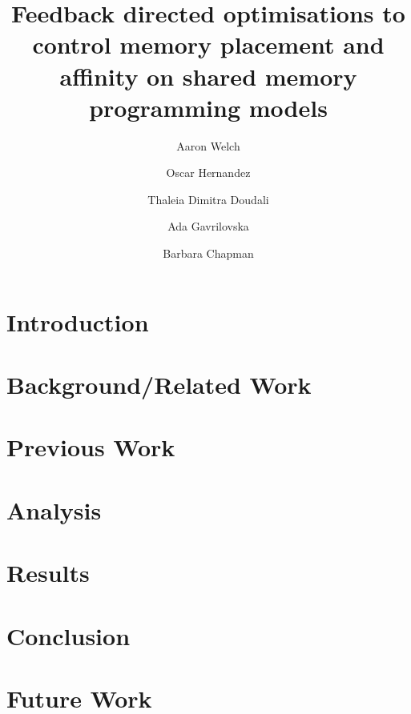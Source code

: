 \documentclass[runningheads]{llncs}
\begin{document}
\title{Feedback directed optimisations to control memory placement and affinity on shared memory programming models}
\author[1, 2]{Aaron Welch}
\author[1]{Oscar Hernandez}
\author[3]{Thaleia Dimitra Doudali}
\author[3]{Ada Gavrilovska}
\author[2]{Barbara Chapman}

\maketitle
\begin{abstract}

\end{abstract}
\section{Introduction}
\label{sec:intro}

\section{Background/Related Work}
\label{sec:background}

\section{Previous Work}
\label{sec:prevwork}

\section{Analysis}
\label{sec:analysis}

\section{Results}
\label{sec:results}

\section{Conclusion}
\label{sec:conclusion}

\section{Future Work}
\label{sec:future}



\end{document}
